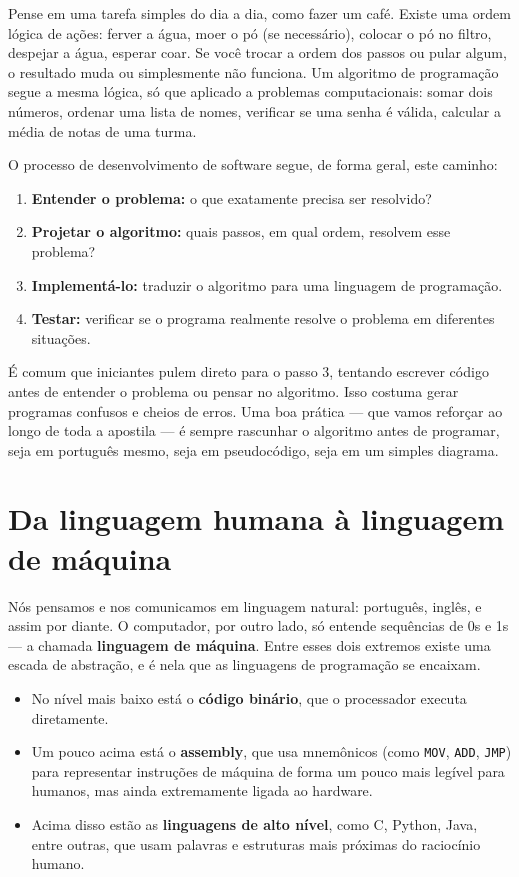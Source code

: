 Pense em uma tarefa simples do dia a dia, como fazer um café. Existe uma ordem lógica de ações: ferver a água, moer o pó (se necessário), colocar o pó no filtro, despejar a água, esperar coar. Se você trocar a ordem dos passos ou pular algum, o resultado muda ou simplesmente não funciona. Um algoritmo de programação segue a mesma lógica, só que aplicado a problemas computacionais: somar dois números, ordenar uma lista de nomes, verificar se uma senha é válida, calcular a média de notas de uma turma.

O processo de desenvolvimento de software segue, de forma geral, este caminho:


\begin{enumerate}

\item \textbf{Entender o problema:} o que exatamente precisa ser resolvido?
\item \textbf{Projetar o algoritmo:} quais passos, em qual ordem, resolvem esse problema?
\item \textbf{Implementá-lo:} traduzir o algoritmo para uma linguagem de programação.
\item \textbf{Testar:} verificar se o programa realmente resolve o problema em diferentes situações.

\end{enumerate}


É comum que iniciantes pulem direto para o passo 3, tentando escrever código antes de entender o problema ou pensar no algoritmo. Isso costuma gerar programas confusos e cheios de erros. Uma boa prática — que vamos reforçar ao longo de toda a apostila — é sempre rascunhar o algoritmo antes de programar, seja em português mesmo, seja em pseudocódigo, seja em um simples diagrama.


\section{Da linguagem humana à linguagem de máquina}

Nós pensamos e nos comunicamos em linguagem natural: português, inglês, e assim por diante. O computador, por outro lado, só entende sequências de 0s e 1s — a chamada \textbf{linguagem de máquina}. Entre esses dois extremos existe uma escada de abstração, e é nela que as linguagens de programação se encaixam.

\begin{itemize}

    \item No nível mais baixo está o \textbf{código binário}, que o processador executa diretamente.
    \item Um pouco acima está o \textbf{assembly}, que usa mnemônicos (como \texttt{MOV}, \texttt{ADD}, \texttt{JMP}) para representar instruções de máquina de forma um pouco mais legível para humanos, mas ainda extremamente ligada ao hardware.
    \item Acima disso estão as \textbf{linguagens de alto nível}, como C, Python, Java, entre outras, que usam palavras e estruturas mais próximas do raciocínio humano.
    
\end{itemize}


